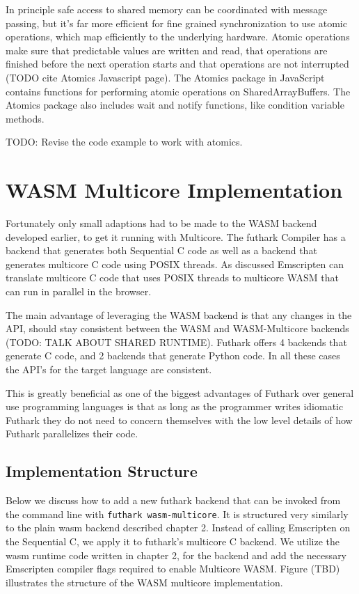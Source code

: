 \documentclass[11pt]{article}
\begin{document}
In principle safe access to shared memory can be coordinated with message passing, but it's far more efficient for fine grained synchronization to use atomic operations, which map efficiently to the underlying hardware. Atomic operations make sure that predictable values are written and read, that operations are finished before the next operation starts and that operations are not interrupted (TODO cite Atomics Javascript page). The Atomics package in JavaScript contains functions for performing atomic operations on SharedArrayBuffers. The Atomics package also includes wait and notify functions, like condition variable methods.

TODO: Revise the code example to work with atomics.


\newpage

\section{WASM Multicore Implementation}



Fortunately only small adaptions had to be made to the WASM backend developed earlier, to get it running with Multicore. The futhark Compiler has a backend that generates both Sequential C code as well as a backend that generates multicore C code using POSIX threads. As discussed Emscripten can translate multicore C code that uses POSIX threads to multicore WASM that can run in parallel in the browser. 

The main advantage of leveraging the WASM backend is that any changes in the API, should stay consistent between the WASM and WASM-Multicore backends (TODO: TALK ABOUT SHARED RUNTIME). Futhark offers 4 backends that generate C code, and 2 backends that generate Python code. In all these cases the API's for the target language are consistent. 


This is greatly beneficial as one of the biggest advantages of Futhark over general use programming languages is that as long as the programmer writes idiomatic Futhark they do not need to concern themselves with the low level details of how Futhark parallelizes their code. 

\subsection{Implementation Structure}

Below we discuss how to add a new futhark backend that can be invoked from the command line with \texttt{futhark wasm-multicore}. It is structured very similarly to the plain wasm backend described chapter 2. Instead of calling Emscripten on the Sequential C, we apply it to futhark's multicore C backend. We utilize the wasm runtime code written in chapter 2, for the backend and add the necessary Emscripten compiler flags required to enable Multicore WASM. Figure (TBD) illustrates the structure of the WASM multicore implementation.
\end{document}

